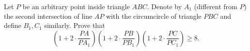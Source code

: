 Let $P$ be an arbitrary point inside triangle $ABC$. Denote by $A_1$ (different from $P$) the second intersection of line $AP$ with the circumcircle of triangle $PBC$ and define $B_1,C_1$ similarly. Prove that \[\left(1+2\cdot\frac{PA}{PA_1}\right)\left(1+2\cdot\frac{PB}{PB_1}\right)\left(1+2\cdot\frac{PC}{PC_1}\right)\geq8.\]